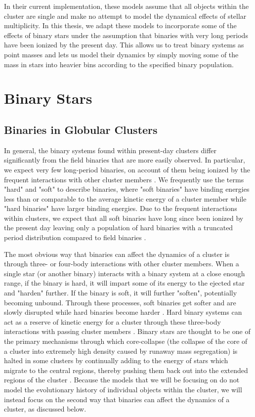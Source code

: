 In their current implementation, these models assume that all objects within the cluster are single
and make no attempt to model the dynamical effects of stellar multiplicity. In this thesis, we
adapt these models to incorporate some of the effects of binary stars under the assumption that
binaries with very long periods have been ionized by the present day. This allows us to treat binary
systems as point masses and lets us model their dynamics by simply moving some of the mass in stars
into heavier bins according to the specified binary population.



\section{Binary Stars}
\subsection{Binaries in Globular Clusters}


In general, the binary systems found within present-day clusters differ significantly from the field
binaries that are more easily observed. In particular, we expect very few long-period binaries, on
account of them being ionized by the frequent interactions with other cluster members
\citep{Heggie2003}. We frequently use the terms "hard" and "soft" to describe binaries, where "soft
binaries" have binding energies less than or comparable to the average kinetic energy of a cluster
member while "hard binaries" have larger binding energies. Due to the frequent interactions within
clusters, we expect that all soft binaries have long since been ionized by the present day leaving
only a population of hard binaries with a truncated period distribution compared to field binaries
\citep{Heggie2003}.



The most obvious way that binaries can affect the dynamics of a cluster is through three- or
four-body interactions with other cluster members. When a single star (or another binary) interacts
with a binary system at a close enough range, if the binary is hard, it will impart some of its
energy to the ejected star and "harden" further. If the binary is soft, it will further "soften",
potentially becoming unbound. Through these processes, soft binaries get softer and are slowly
disrupted while hard binaries become harder \citep{Heggie1975}. Hard binary systems can act as a
reserve of kinetic energy for a cluster through these three-body interactions with passing cluster
members \citep{Heggie2003}. Binary stars are thought to be one of the primary mechanisms through
which core-collapse (the collapse of the core of a cluster into extremely high density caused by
runaway mass segregation) is halted in some clusters by continually adding to the energy of stars
which migrate to the central regions, thereby pushing them back out into the extended regions of the
cluster \citep{Chatterjee2013}. Because the models that we will be focusing on do not model the
evolutionary history of individual objects within the cluster, we will instead focus on the second
way that binaries can affect the dynamics of a cluster, as discussed below.


